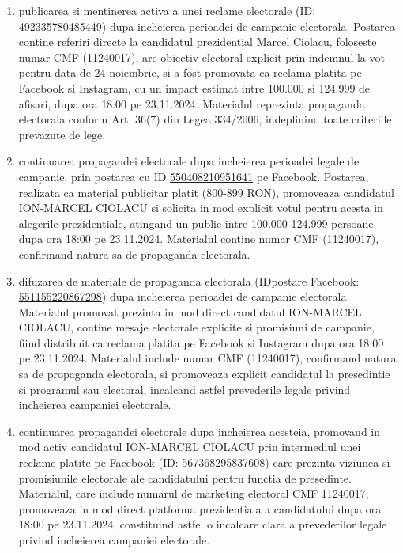 \documentclass[a4paper,12pt]{article}
\begin{document}
\begin{enumerate}[leftmargin=*, label=\arabic*.)]
    \item publicarea si mentinerea activa a unei reclame electorale (ID: \href{https://www.facebook.com/ads/library/?id=492335780485449}{492335780485449}) dupa incheierea perioadei de campanie electorala. Postarea contine referiri directe la candidatul prezidential Marcel Ciolacu, foloseste numar CMF (11240017), are obiectiv electoral explicit prin indemnul la vot pentru data de 24 noiembrie, si a fost promovata ca reclama platita pe Facebook si Instagram, cu un impact estimat intre 100.000 si 124.999 de afisari, dupa ora 18:00 pe 23.11.2024. Materialul reprezinta propaganda electorala conform Art. 36(7) din Legea 334/2006, indeplinind toate criteriile prevazute de lege.
    \item continuarea propagandei electorale dupa incheierea perioadei legale de campanie, prin postarea cu ID \href{https://www.facebook.com/ads/library/?id=550408210951641}{550408210951641} pe Facebook. Postarea, realizata ca material publicitar platit (800-899 RON), promoveaza candidatul ION-MARCEL CIOLACU si solicita in mod explicit votul pentru acesta in alegerile prezidentiale, atingand un public intre 100.000-124.999 persoane dupa ora 18:00 pe 23.11.2024. Materialul contine numar CMF (11240017), confirmand natura sa de propaganda electorala.
    \item difuzarea de materiale de propaganda electorala (IDpostare Facebook: \href{https://www.facebook.com/ads/library/?id=551155220867298}{551155220867298}) dupa incheierea perioadei de campanie electorala. Materialul promovat prezinta in mod direct candidatul ION-MARCEL CIOLACU, contine mesaje electorale explicite si promisiuni de campanie, fiind distribuit ca reclama platita pe Facebook si Instagram dupa ora 18:00 pe 23.11.2024. Materialul include numar CMF (11240017), confirmand natura sa de propaganda electorala, si promoveaza explicit candidatul la presedintie si programul sau electoral, incalcand astfel prevederile legale privind incheierea campaniei electorale.
    \item continuarea propagandei electorale dupa incheierea acesteia, promovand in mod activ candidatul ION-MARCEL CIOLACU prin intermediul unei reclame platite pe Facebook (ID: \href{https://www.facebook.com/ads/library/?id=567368295837608}{567368295837608}) care prezinta viziunea si promisiunile electorale ale candidatului pentru functia de presedinte. Materialul, care include numarul de marketing electoral CMF 11240017, promoveaza in mod direct platforma prezidentiala a candidatului dupa ora 18:00 pe 23.11.2024, constituind astfel o incalcare clara a prevederilor legale privind incheierea campaniei electorale.

\end{enumerate}
\end{document}
